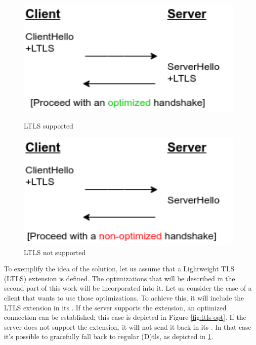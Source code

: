\documentclass{llncs}
\begin{document}
\begin{figure}
    \centering
    \begin{minipage}{0.5\textwidth}
        \centering
        \includegraphics[width=1.0\textwidth]{img/optimized-handshake.png} %
        \caption{\label{fig:ltls-opt} LTLS supported}
    \end{minipage}\hfill
    \begin{minipage}{0.5\textwidth}
        \centering
        \includegraphics[width=1.0\textwidth]{img/non-optimized-handshake.png} %
        \caption{\label{fig:ltls-non-opt} LTLS not supported}
    \end{minipage}
\end{figure}

To exemplify the idea of the solution, let us assume that a
Lightweight TLS (LTLS) extension is defined. The optimizations that will be described in the second part of this work will be incorporated into it. Let us consider the case of a client that wants to use those
optimizations. To achieve this, it will include the LTLS extension in its
. If the server supports the extension, an
optimized connection can be established; this case is depicted in Figure \ref{fig:ltls-opt}. If the server does not support the extension, it will not
send it back in its . In that case it's possible
to gracefully fall back to regular (D)\gls{tls}, as depicted in \ref{fig:ltls-non-opt}.
\end{document}
